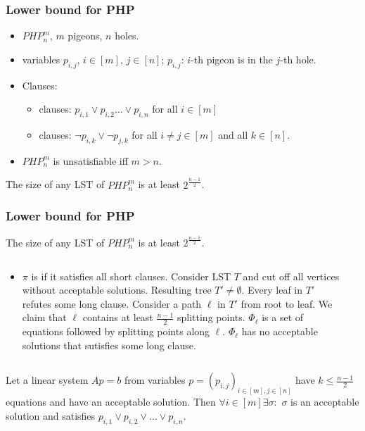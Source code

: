 \begin{frame}
    \frametitle{Lower bound for PHP}

    \begin{itemize}
		\item $PHP^m_n$, $m$ pigeons, $n$ holes. 
		\item variables $p_{i, j}$, $i \in [m]$, $j \in [n]$; 
			$p_{i, j}$: $i$-th pigeon is in the $j$-th hole.
		\item Clauses: 
			\begin{itemize}
				\item {} clauses: $p_{i, 1} \lor p_{i, 2} \dots
		            \lor p_{i, n}$ for all $i \in [m]$ 
				\item {} clauses: $\lnot p_{i, k} \lor \lnot
            		p_{j, k}$ for all $i \neq j \in [m]$ and all $k \in [n]$.
			\end{itemize}
		\item $PHP^m_n$ is unsatisfiable iff $m > n$.

	\end{itemize}
    
	\pause \myth The size of any LST of $PHP^m_n$ is at least $2^{\frac{n - 1}{2}}$.

\end{frame}



\begin{frame}
    \frametitle{Lower bound for PHP}

    \myth The size of any LST of $PHP^m_n$ is at least $2^{\frac{n-1}{2}}$.

	\dok
	\begin{columns}
		\begin{column}{8.5cm}
			\begin{itemize}
				\item $\pi$ is  if it satisfies all short
		            clauses. 
				\pitem Consider LST $T$ and cut off all vertices without acceptable
	                solutions. Resulting tree $T'\neq \emptyset$. 
				\pitem Every leaf in $T'$ refutes some long clause.
				\pitem Consider a path $\ell$ in $T'$ from root to leaf. We claim
                	that $\ell$ contains at least $\frac{n - 1}{2}$ splitting
                    points.
				\pitem $\Phi_\ell$ is a set of equations followed by splitting points
	                along $\ell$. $\Phi_\ell$ has no acceptable solutions that sutisfies
    	            some long clause. 
			\end{itemize}
		\end{column}
		\begin{column}{2cm}
		\end{column}
	\end{columns}
    
	\pause \mylem Let a linear system $Ap = b$ from variables
    $p = (p_{i, j})_{i \in [m], j \in [n]}$ have  $k \le \frac{n - 1}{2}$ equations
    and have an acceptable solution. Then  $\forall i \in [m] \exists \sigma:$
    $\sigma$ is an acceptable solution and satisfies $p_{i, 1} \lor p_{i, 2} \lor
    \dots \lor p_{i, n}$.
\end{frame}



